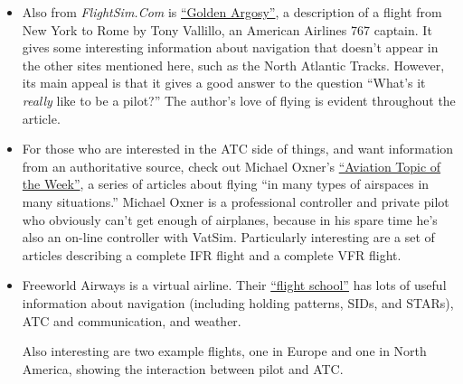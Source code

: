 \begin{itemize}
%
%

%
%

\item Also from \textit{FlightSim.Com} is
  \href{http://www.flightsim.com/main/feature/argosy1.htm}{``Golden
    Argosy''}, a description of a flight from New York to Rome by Tony
  Vallillo, an American Airlines 767 captain.  It gives some
  interesting information about navigation that doesn't appear in the
  other sites mentioned here, such as the North Atlantic Tracks.
  However, its main appeal is that it gives a good answer to the
  question ``What's it \emph{really} like to be a pilot?''  The
  author's love of flying is evident throughout the article.

\item For those who are interested in the ATC side of things, and want
  information from an authoritative source, check out Michael Oxner's
  \href{http://bathursted.ccnb.nb.ca/vatcan/fir/moncton/WeeklyTopics/WeeklyTopicIntro.html}{``Aviation
    Topic of the Week''}, a series of articles about flying ``in many
  types of airspaces in many situations.''  Michael Oxner is a
  professional controller and private pilot who obviously can't get
  enough of airplanes, because in his spare time he's also an on-line
  controller with VatSim.  Particularly interesting are a set of
  articles describing a complete IFR flight and a complete VFR flight.



\item Freeworld Airways is a virtual airline.  Their
  \href{http://www.freeworld-airways.net/main/training.php}{``flight
    school''} has lots of useful information about navigation
  (including holding patterns, SIDs, and STARs), ATC and
  communication, and weather.

  Also interesting are two example flights, one in Europe and one in
  North America, showing the interaction between pilot and ATC.

\end{itemize}
